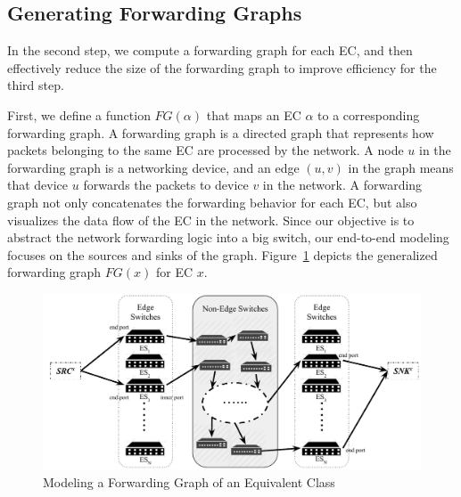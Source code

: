 \subsection{Generating Forwarding Graphs}
\label{Sec:Generating Forwarding Graphs}

In the second step, we compute a forwarding graph for each EC, and then effectively reduce the size of the forwarding graph to improve efficiency for the third step. 

First, we define a function $FG(\alpha)$ that maps an EC $\alpha$ to a corresponding forwarding graph. A forwarding graph is a directed graph that represents how packets belonging to the same EC are processed by the network. A node $u$ in the forwarding graph is a networking device, and an edge $(u, v)$ in the graph means that device $u$ forwards the packets to device $v$ in the network. 
A forwarding graph not only concatenates the forwarding behavior for each EC, but also visualizes the data flow of the EC in the network. 
Since our objective is to abstract the network forwarding logic into a big switch, our end-to-end modeling focuses on the sources and sinks of the graph. 
Figure~\ref{Fig:ForwardingGraphECX} depicts the generalized forwarding graph $FG(x)$ for EC $x$. 
 

\begin{figure}[t]
\centering
\includegraphics[scale=.75]{figures/ForwardingGraph.pdf}
\caption{Modeling a Forwarding Graph of an Equivalent Class}
\label{Fig:ForwardingGraphECX}
\end{figure}

